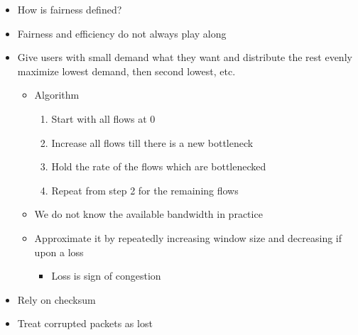 \begin{itemize}
\begin{itemize}
\begin{itemize}
\begin{itemize}
                        \end{itemize}
                \end{itemize}
        \end{itemize}
        \begin{itemize}
            \item How is fairness defined?
            \item Fairness and efficiency do not always play along
            \item Give users with small demand what they want and distribute the rest evenly
             maximize lowest demand, then second lowest, etc.
                \begin{itemize}
                    \item Algorithm
                        \begin{enumerate}
                            \item Start with all flows at $0$
                            \item Increase all flows till there is a new bottleneck
                            \item Hold the rate of the flows which are bottlenecked
                            \item Repeat from step 2 for the remaining flows
                        \end{enumerate}
                    \item We do not know the available bandwidth in practice
                    \item Approximate it by repeatedly increasing window size and decreasing if upon a loss
                        \begin{itemize}
                            \item Loss is sign of congestion
                        \end{itemize}
                \end{itemize}
        \end{itemize}
        \begin{itemize}
                \begin{itemize}
                    \item Rely on checksum
                    \item Treat corrupted packets as lost
                \end{itemize}

\end{itemize}
\end{itemize}
